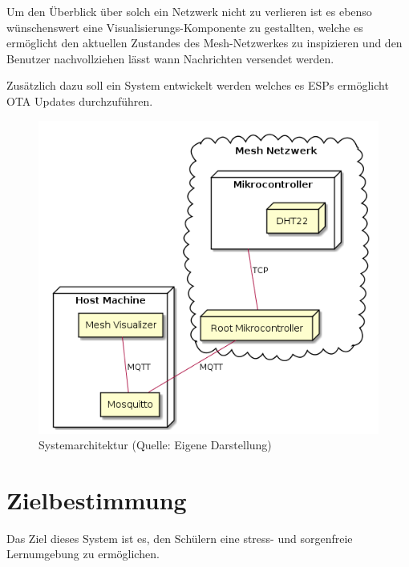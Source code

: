 Um den Überblick über solch ein Netzwerk nicht zu verlieren ist es ebenso wünschenswert eine Visualisierungs-Komponente zu gestallten, welche es ermöglicht den aktuellen Zustandes des Mesh-Netzwerkes zu inspizieren und den Benutzer nachvollziehen lässt wann Nachrichten versendet werden.

Zusätzlich dazu soll ein System entwickelt werden welches es ESPs ermöglicht OTA Updates durchzuführen.

\begin{figure}[H]
    \centering
    \includegraphics[scale=0.7]{diagrams/deployment.png}
    \caption{Systemarchitektur (Quelle: Eigene Darstellung)}
    \label{abb:deployment}
\end{figure}

\section{Zielbestimmung}
Das Ziel dieses System ist es, den Schülern eine stress- und sorgenfreie Lernumgebung zu ermöglichen.
